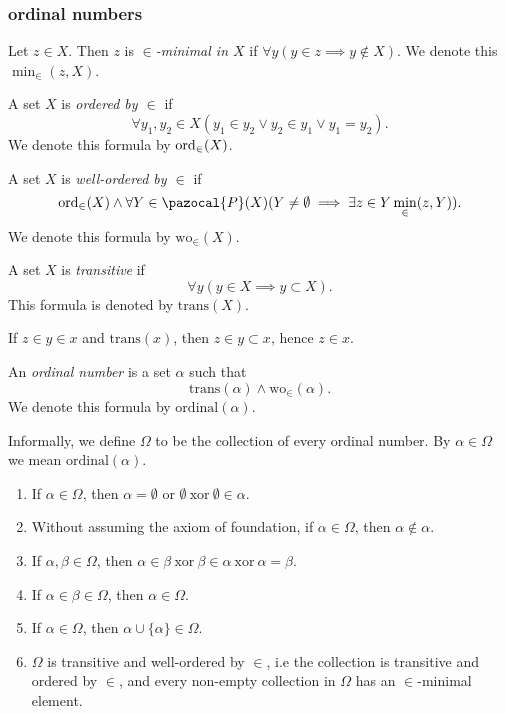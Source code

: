 \subsubsection{ordinal numbers}
\begin{definition}
    Let $z\in X$. Then $z$ is \textit{$\in$-minimal in $X$} if $\forall y(y\in z \implies y\notin X)$. We denote this $\min_\in(z,X)$.
\end{definition}
\begin{definition}
    A set $X$ is \textit{ordered by $\in$} if 
    $$\forall y_1,y_2\in X(y_1\in y_2\vee y_2\in y_1 \vee y_1=y_2).$$
    We denote this formula by $\mathrm{ord}_\in(X)$.
\end{definition}
\begin{definition}
    A set $X$ is \textit{well-ordered by $\in$} if 
    $$ \ord_\in(X) \wedge \forall Y \in \pazocal{P}(X)(Y\neq \emptyset \implies \exists z \in Y \min_\in(z,Y)).$$
    We denote this formula by $\mathrm{wo}_\in(X)$.
\end{definition}
\begin{definition}
    A set $X$ is \textit{transitive} if 
    $$\forall y(y\in X \implies y\subset X).$$
    This formula is denoted by $\mathrm{trans}(X)$. 
\end{definition}
\begin{remark}
    If $z\in y\in x$ and $\mathrm{trans}(x)$, then $z\in y\subset x$, hence $z\in x$. 
\end{remark}
\begin{definition}
    An \textit{ordinal number} is a set $\alpha$ such that 
    $$\mathrm{trans}(\alpha)\wedge \mathrm{wo}_\in(\alpha).$$
    We denote this formula by $\mathrm{ordinal}(\alpha)$.
\end{definition}
\begin{remark}
    Informally, we define $\Omega$ to be the collection of every ordinal number. By $\alpha\in\Omega$ we mean $\mathrm{ordinal}(\alpha)$. 
\end{remark}
\begin{theorem}\label{FactsAboutOrdinals}
    \begin{enumerate}
        \item If $\alpha\in \Omega$, then $\alpha=\emptyset$ or $\emptyset\ \mathrm{xor}\ \emptyset\in\alpha$.
        \item Without assuming the axiom of foundation, if $\alpha\in \Omega$, then $\alpha\notin \alpha$.
        \item If $\alpha,\beta\in \Omega$, then $\alpha\in \beta\ \mathrm{ xor }\ \beta\in \alpha \ \mathrm{ xor } \ \alpha = \beta$.
        \item  If $\alpha \in \beta \in \Omega$, then $\alpha\in \Omega$.
        \item If $\alpha\in\Omega$, then $\alpha\cup\{\alpha\} \in \Omega$.
        \item $\Omega$ is transitive and well-ordered by $\in$, i.e the collection is transitive and ordered by $\in$, and every non-empty collection in $\Omega$ has an $\in$-minimal element.
    \end{enumerate}
\end{theorem}
